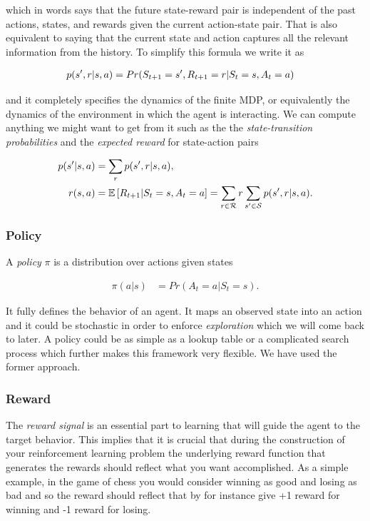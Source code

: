 \documentclass[result.tex]{subfiles}
\begin{document}
    which in words says that the future state-reward pair is independent of the past actions, states, and rewards given the current action-state pair. That is also equivalent to saying that the current state and action captures all the relevant information from the history. To simplify this formula we write it as

    \begin{align*}
        p(s^\prime, r | s, a) &=
        Pr(S_{t + 1} = s^\prime, R_{t + 1} = r | S_t = s, A_t = a)
    \end{align*}

    and it completely specifies the dynamics of the finite MDP, or equivalently the dynamics of the environment in which the agent is interacting. We can compute anything we might want to get from it such as the the \textit{state-transition probabilities} and the \textit{expected reward} for state-action pairs

    \begin{align*}
        p(s^\prime | s, a) &=
        \sum_r p(s^\prime, r | s, a), \\
        r(s, a) &=
        \mathbb{E} \left[ R_{t + 1} | S_t = s, A_t = a \right] =
        \sum_{r \in \mathcal{R}} r \sum_{s^\prime \in \mathcal{S}} p(s^\prime, r | s, a).
    \end{align*}

    \subsubsection*{Policy}

    A \textit{policy} $\pi$ is a distribution over actions given states

    \begin{align*}
        \pi(a | s) &= Pr(A_t = a | S_t = s).
    \end{align*}

    It fully defines the behavior of an agent. It maps an observed state into an action and it could be stochastic in order to enforce \textit{exploration} which we will come back to later. A policy could be as simple as a lookup table or a complicated search process which further makes this framework very flexible. We have used the former approach.

    \subsubsection*{Reward}

    The \textit{reward signal} is an essential part to learning that will guide the agent to the target behavior. This implies that it is crucial that during the construction of your reinforcement learning problem the underlying reward function that generates the rewards should reflect what you want accomplished. As a simple example, in the game of chess you would consider winning as good and losing as bad and so the reward should reflect that by for instance give +1 reward for winning and -1 reward for losing.
\end{document}
